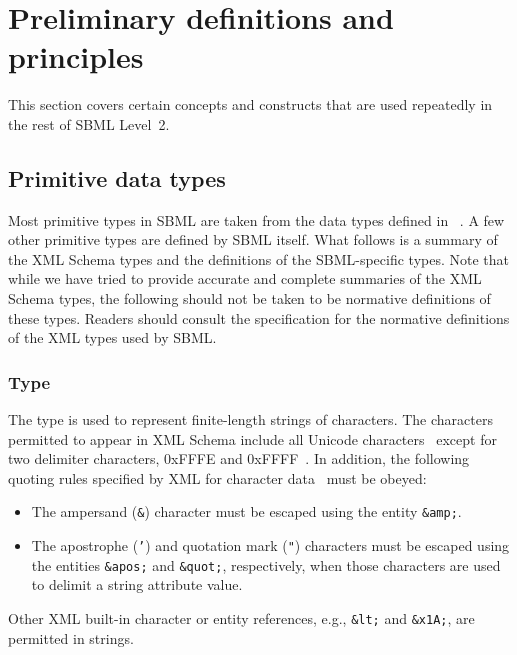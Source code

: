 
\section{Preliminary definitions and principles}
\label{sec:general}

This section covers certain concepts and constructs that are used
repeatedly in the rest of SBML Level~2.


\subsection{Primitive data types}
\label{sec:primitive-types}

Most primitive types in SBML are taken from the data types defined
in \xmlschemaone~\citep{biron:2000,fallside:2000,thompson:2000}.
A few other primitive types are defined by SBML itself.  What
follows is a summary of the XML Schema types and the definitions
of the SBML-specific types.  Note that while we have tried to
provide accurate and complete summaries of the XML Schema types,
the following should not be taken to be normative definitions of
these types.  Readers should consult the \xmlschemaone
specification for the normative definitions of the XML types used
by SBML.


\subsubsection{Type }
\label{sec:string}

The \xmlschemaone type  is used to represent
finite-length strings of characters.  The characters permitted to
appear in XML Schema  include all Unicode
characters~\citep{unicode:1996} except for two delimiter
characters, 0xFFFE and 0xFFFF~\citep{biron:2000}.  In addition,
the following quoting rules specified by XML for character
data~\citep{bray:2000} must be obeyed:
\begin{itemize}

\item The ampersand (\texttt{\&}) character must be escaped using
  the entity \texttt{\&amp;}.

\item The apostrophe (\texttt{'}) and quotation mark (\texttt{"})
  characters must be escaped using the entities \texttt{\&apos;}
  and \texttt{\&quot;}, respectively, when those characters are
  used to delimit a string attribute value.

\end{itemize}
Other XML built-in character or entity references, e.g.,
\texttt{\&lt;} and \texttt{\&x1A;}, are permitted in strings.


